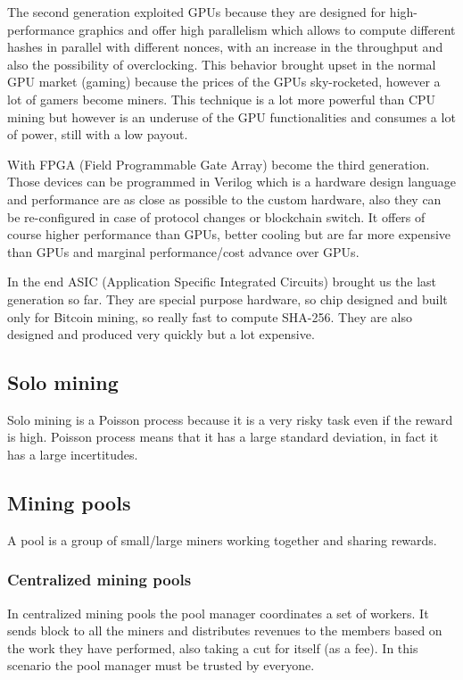 The second generation exploited GPUs because they are designed for high-performance graphics and offer high parallelism which allows to compute different hashes in parallel with different nonces, with an increase in the throughput and also the possibility of overclocking.
This behavior brought upset in the normal GPU market (gaming) because the prices of the GPUs sky-rocketed, however a lot of gamers become miners.
This technique is a lot more powerful than CPU mining but however is an underuse of the GPU functionalities and consumes a lot of power, still with a low payout.

With FPGA (Field Programmable Gate Array) become the third generation.
Those devices can be programmed in Verilog which is a hardware design language and performance are as close as possible to the custom hardware, also they can be re-configured in case of protocol changes or blockchain switch.
It offers of course higher performance than GPUs, better cooling but are far more expensive than GPUs and marginal performance/cost advance over GPUs.

In the end ASIC (Application Specific Integrated Circuits) brought us the last generation so far.
They are special purpose hardware, so chip designed and built only for Bitcoin mining, so really fast to compute SHA-256.
They are also designed and produced very quickly but a lot expensive.

\subsection{Solo mining}
Solo mining is a Poisson process because it is a very risky task even if the reward is high.
Poisson process means that it has a large standard deviation, in fact it has a large incertitudes.

\subsection{Mining pools}
A pool is a group of small/large miners working together and sharing rewards.

\subsubsection{Centralized mining pools}
In centralized mining pools the pool manager coordinates a set of workers.
It sends block to all the miners and distributes revenues to the members based on the work they have performed, also taking a cut for itself (as a fee).
In this scenario the pool manager must be trusted by everyone.

